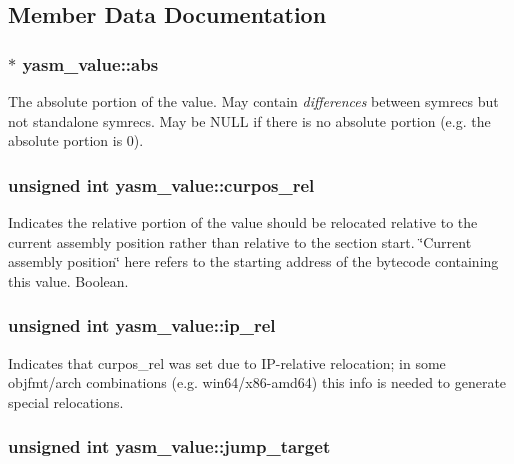 \subsection{Member Data Documentation}
\hypertarget{structyasm__value_a07c7cd6f8c7d13046fa33261bd6c2b31}{
\subsubsection[{abs}]{$\ast$ yasm\-\_\-value\-::abs}}\label{structyasm__value_a07c7cd6f8c7d13046fa33261bd6c2b31}
The absolute portion of the value. May contain {\itshape differences} between symrecs but not standalone symrecs. May be N\-U\-L\-L if there is no absolute portion (e.\-g. the absolute portion is 0). \hypertarget{structyasm__value_a4a6d7102566cd451bfca9be1137f7bad}{
\subsubsection[{curpos\-\_\-rel}]{\setlength{\rightskip}{0pt plus 5cm}unsigned int yasm\-\_\-value\-::curpos\-\_\-rel}}\label{structyasm__value_a4a6d7102566cd451bfca9be1137f7bad}
Indicates the relative portion of the value should be relocated relative to the current assembly position rather than relative to the section start. \char`\"{}\-Current assembly position\char`\"{} here refers to the starting address of the bytecode containing this value. Boolean. \hypertarget{structyasm__value_a80a21df6cc5fa6feb0a8270708e252fc}{
\subsubsection[{ip\-\_\-rel}]{\setlength{\rightskip}{0pt plus 5cm}unsigned int yasm\-\_\-value\-::ip\-\_\-rel}}\label{structyasm__value_a80a21df6cc5fa6feb0a8270708e252fc}
Indicates that curpos\-\_\-rel was set due to I\-P-\/relative relocation; in some objfmt/arch combinations (e.\-g. win64/x86-\/amd64) this info is needed to generate special relocations. \hypertarget{structyasm__value_a42ff68ffe2193227869a3d20553b6782}{
\subsubsection[{jump\-\_\-target}]{\setlength{\rightskip}{0pt plus 5cm}unsigned int yasm\-\_\-value\-::jump\-\_\-target}}\label{structyasm__value_a42ff68ffe2193227869a3d20553b6782}
